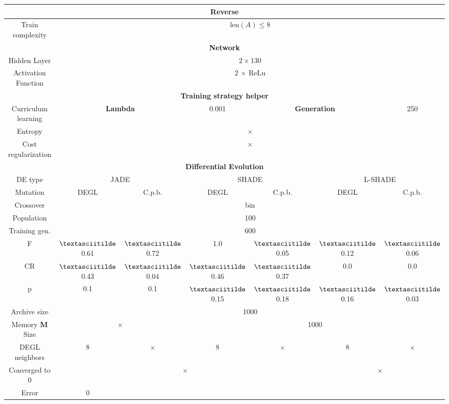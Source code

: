 \begin{table}[!h]
	\centering
	\begin{tabular}{|c|c|c|c|c|c|c|}
		\hline
		\multicolumn{7}{|c|}{\textbf{Reverse}} \\ \hline
		Train complexity & \multicolumn{6}{c|}{$\textrm{len}(A) \leq 8$} \\ \hline \hline \hline
		\multicolumn{7}{|c|}{\textbf{Network}} \\ \hline
		Hidden Layer & \multicolumn{6}{c|}{$2 \times 130$}\\ \hline
		Activation Function & \multicolumn{6}{c|}{2 $\times$ ReLu}\\ \hline \hline
		
		\multicolumn{7}{|c|}{\textbf{Training strategy helper}} \\ \hline
		Curriculum learning & \multicolumn{2}{c|}{\textbf{Lambda}} & 0.001 & \multicolumn{2}{c|}{\textbf{Generation}} & 250\\ \hline
		Entropy & \multicolumn{6}{c|}{$\times$}\\ \hline
		Cost regularization & \multicolumn{6}{c|}{$\times$}\\ \hline \hline		
		
		\multicolumn{7}{|c|}{\textbf{Differential Evolution}} \\ \hline
		DE type & \multicolumn{2}{c|}{JADE} & \multicolumn{2}{c|}{SHADE} & \multicolumn{2}{c|}{L-SHADE}  \\ \hline
		Mutation & DEGL & C.p.b. & DEGL & C.p.b. & DEGL & C.p.b. \\ \hline
		Crossover & \multicolumn{6}{c|}{bin} \\ \hline
		Population & \multicolumn{6}{c|}{100} \\ \hline
		Training gen. & \multicolumn{6}{c|}{600} \\ \hline
		F & $\textasciitilde$0.61 & $\textasciitilde$0.72 & 1.0 & $\textasciitilde$0.05 & $\textasciitilde$0.12 & $\textasciitilde$0.06 \\ \hline
		CR & $\textasciitilde$0.43 & $\textasciitilde$0.04 & $\textasciitilde$0.46 & $\textasciitilde$0.37 & 0.0 & 0.0 \\ \hline
		p & 0.1 & 0.1 & $\textasciitilde$0.15 & $\textasciitilde$0.18 & $\textasciitilde$0.16 & $\textasciitilde$0.03 \\ \hline
		Archive size & \multicolumn{6}{c|}{1000} \\ \hline
		Memory \textbf{M} Size & \multicolumn{2}{c|}{$\times$} & \multicolumn{4}{c|}{1000} \\ \hline
		DEGL neighbors & 8 & $\times$ & 8 & $\times$ & 8 & $\times$ \\ \hline
		Converged to 0 & \checkmark & \multicolumn{2}{c|}{$\times$} & \checkmark & \multicolumn{2}{c|}{$\times$} \\ \hline
		Error & 0 & & & & & \\ \hline\hline
		

\end{tabular}
\end{table}
